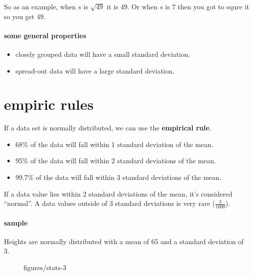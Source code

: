 \documentclass{book}
\begin{document}
So as an example, when $s$ is $\sqrt{49}$ it is $49$. Or when  $s$ is $7$ then
you got to squre it so you get $49$.

\paragraph{some general properties}
\begin{itemize}
    \item closely grouped data will have a small standard deviation.
    \item spread-out data will have a large standard deviation.
\end{itemize}

\section{empiric rules}
If a data set is normally distributed, we can use the \textbf{empirical rule}.
\begin{itemize}
    \item 68\% of the data will fall within 1 standard deviation of the mean.
    \item 95\% of the data will fall within 2 standard deviations of the mean.
    \item 99.7\% of the data will fall within 3 standard deviations of the mean.
\end{itemize}

If a data value lies within 2 standard deviations of the mean, it's considered
``normal''. A data values outside of 3 standard deviations is very rare ($\frac{3}{1000}$).

\paragraph{sample}
Heights are normally distributed with a mean of 65 and a standard deviation of 3.


\begin{figure}[ht]
    \centering
    \caption{figures/stats-3}
    \label{fig:stats-3}
\end{figure}


\end{document}
